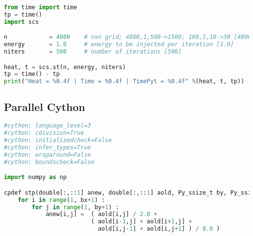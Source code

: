 \begin{lstlisting}[language=Python, caption={Serial Cython implementation of the stencil test case - Python main code.}]
from time import time
tp = time()
import scs

n            = 4800    # nxn grid; 4800,1,500->1500; 100,1,10->30 [4800]
energy       = 1.0     # energy to be injected per iteration [1.0]
niters       = 500     # number of iterations [500]

heat, t = scs.st(n, energy, niters)
tp = time() - tp
print("Heat = %0.4f | Time = %0.4f | TimePyt = %0.4f" %(heat, t, tp))
\end{lstlisting}




\subsection{Parallel Cython}
\begin{lstlisting}[language=Python, caption={Parallel Cython implementation of the stencil test case - Cython module.}]
#cython: language_level=3
#cython: cdivision=True
#cython: initializedcheck=False
#cython: infer_types=True
#cython: wraparound=False
#cython: boundscheck=False

import numpy as np

cpdef stp(double[:,::1] anew, double[:,::1] aold, Py_ssize_t by, Py_ssize_t bx) :
    for i in range(1, bx+1) :
        for j in range(1, by+1) :
            anew[i,j] =  ( aold[i,j] / 2.0 + 
                         ( aold[i-1,j] + aold[i+1,j] + 
                           aold[i,j-1] + aold[i,j+1] ) / 8.0 )
\end{lstlisting}




